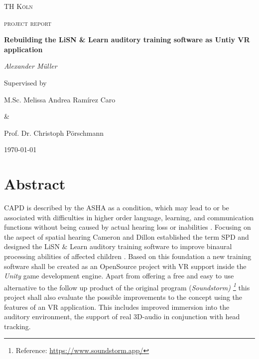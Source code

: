 \documentclass[a4paper,11pt]{article}%
\renewcommand{\\}{\vspace*{0.5\baselineskip} \newline}
\begin{document}

\begin{titlepage}
	\centering
	{\scshape\LARGE TH Köln \par}
	\vspace{1cm}
	{\scshape\Large project report\par}
	\vspace{1.5cm}
	{\huge\bfseries Rebuilding the \acs{LiSN} \& Learn auditory training software as Untiy \acs{VR} application\par}
	\vspace{2cm}
	{\Large\itshape Alexander Müller \par}
	\vfill
	Supervised by\par
	M.Sc. Melissa Andrea Ramírez Caro \par \&  \par Prof. Dr. Christoph Pörschmann
	\vfill

	{\large \today\par}
\end{titlepage}


\newpage

\tableofcontents
\newpage



\section*{Abstract}
\ac{CAPD} is described by the \ac{ASHA} as a condition, which \dq may lead to or be associated with difficulties in higher order language, learning, and communication functions\dq{} without being caused by actual hearing loss or inabilities \cite{ASHA}. Focusing on the aspect of spatial hearing Cameron and Dillon established the term \ac{SPD} and designed the \ac{LiSN} $\&$ Learn auditory training software to improve binaural processing abilities of affected children \cite{LiSN-A}.
\newline
\newline
Based on this foundation a new training software shall be created as an OpenSource project with \ac{VR} support inside the \textit{Unity} game development engine. Apart from offering a free and easy to use alternative to the follow up product of the original program (\textit{Soundstorm) \footnote{Reference: \url{https://www.soundstorm.app/}}} this project shall also evaluate the possible improvements to the concept using the features of an \ac{VR} application. This includes improved immersion into the auditory environment, the support of real 3D-audio in conjunction with head tracking.
\end{document}
